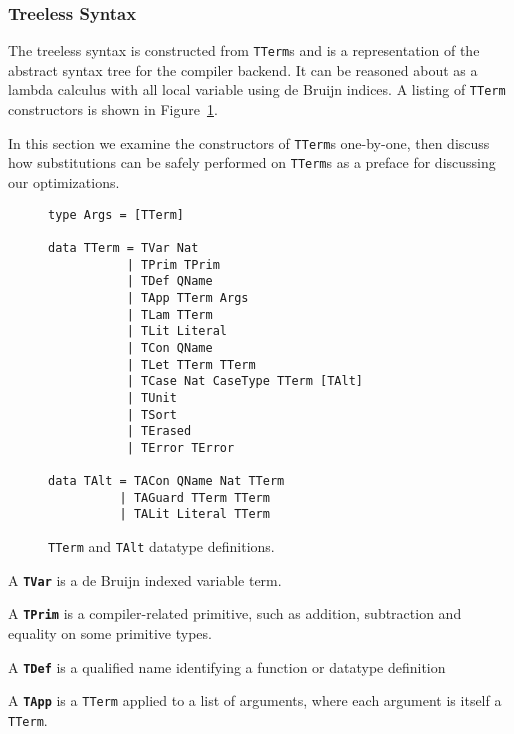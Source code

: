 \subsubsection{Treeless Syntax}

The treeless syntax is constructed from \lstinline{TTerm}s %
and is a representation of the abstract syntax tree for the compiler backend. It can be reasoned about as a lambda calculus with all local variable using de Bruijn indices. A listing of \lstinline{TTerm} constructors is shown in Figure~\ref{code:TTerm}.

In this section we examine the constructors of \lstinline{TTerm}s one-by-one\cite{agdahackage}, then discuss how substitutions can be safely performed on \lstinline{TTerm}s as a preface for discussing our optimizations.


\begin{figure}
\begin{lstlisting}[style=blockhaskell]
type Args = [TTerm]

data TTerm = TVar Nat
           | TPrim TPrim
           | TDef QName
           | TApp TTerm Args
           | TLam TTerm
           | TLit Literal
           | TCon QName
           | TLet TTerm TTerm
           | TCase Nat CaseType TTerm [TAlt]
           | TUnit
           | TSort
           | TErased
           | TError TError

data TAlt = TACon QName Nat TTerm
          | TAGuard TTerm TTerm
          | TALit Literal TTerm
\end{lstlisting}
\caption{\lstinline{TTerm} and \lstinline{TAlt} datatype definitions.}
\label{code:TTerm}
\end{figure}


A \textbf{\lstinline{TVar}} is a de Bruijn indexed variable term.

A \textbf{\lstinline{TPrim}} is a compiler-related primitive, such as addition, subtraction and equality on some primitive types.

A \textbf{\lstinline{TDef}} is a qualified name identifying a function or datatype definition %

A \textbf{\lstinline{TApp}} is a \lstinline{TTerm} applied to a list of arguments, where each argument is itself a \lstinline{TTerm}.

